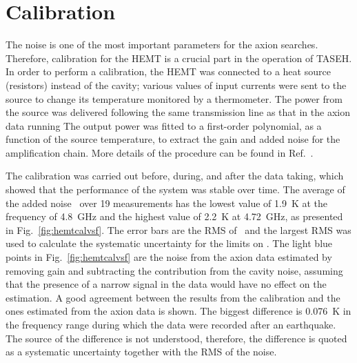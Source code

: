 \section{Calibration}
\label{sec:calibration}

The noise is one of the most important 
parameters for the axion searches. Therefore, calibration for the HEMT is a 
crucial part in the operation of TASEH. In order to perform a calibration, 
the HEMT was connected to a heat source (resistors) instead of the cavity; 
various values of input currents were sent to the source to change its 
temperature monitored by a thermometer. The power from the source 
was delivered following the same transmission line as that in the axion 
data running
The output power was fitted to a first-order polynomial, as a function of the source temperature, 
to extract the gain and added noise for the amplification chain. More details of the 
procedure can be found in Ref.~\cite{TASEHInstrumentation}. 

The calibration was carried out before, 
during, and after the data taking, which showed that the performance of the system
was stable over time. The average of the added noise \ta\ over 19 measurements 
has the lowest value of 1.9~K at the frequency of 4.8~GHz and the highest value of 
2.2~K at 4.72~GHz, as presented in Fig.~\ref{fig:hemtcalvsf}. 
The error bars are the RMS of \ta\ and the largest RMS was used to calculate 
the systematic uncertainty for the limits on \gagg. The light blue points in 
Fig.~\ref{fig:hemtcalvsf} are the noise from the axion data estimated by 
removing gain and subtracting the contribution from the cavity noise, assuming 
that the presence of a narrow signal in the data would have no effect on the 
estimation. A good agreement between the results from the calibration  
and the ones estimated from the axion data is shown. The biggest 
difference is 0.076~K in the frequency range during which the data were 
recorded after an earthquake. The source of the difference is not understood, 
therefore, the difference is quoted as a systematic uncertainty together 
with the RMS of the noise.

